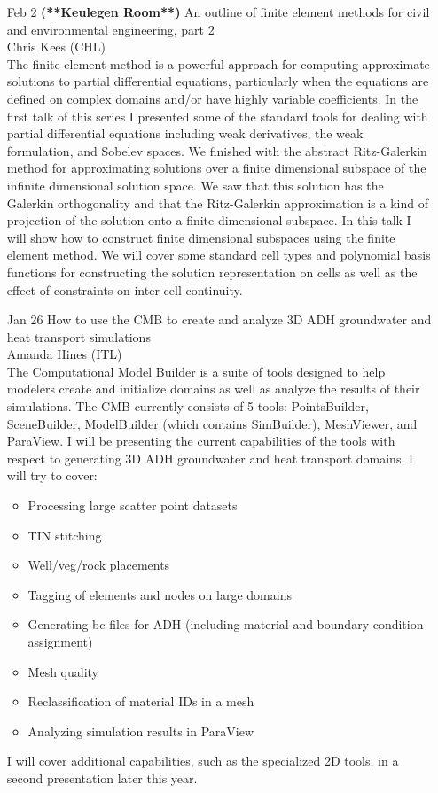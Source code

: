 \documentclass[12]{article}
\begin{document}
\begin{enumerate}
\item[Feb 2 {\bf (**Keulegen Room**)}]An outline of finite element methods for civil and environmental engineering, part 2\\Chris Kees (CHL)\\
The finite element method is a powerful approach for computing approximate solutions to partial differential equations, particularly when the equations are defined on complex domains and/or have highly variable coefficients. In the first talk of this series I presented some of the standard tools for dealing with partial differential equations including weak derivatives, the weak formulation, and Sobelev spaces. We finished with the abstract Ritz-Galerkin method for approximating solutions over a finite dimensional subspace of the infinite dimensional solution space. We saw that this solution has the Galerkin orthogonality and that the Ritz-Galerkin approximation is a kind of projection of the solution onto a finite dimensional subspace. In this talk I will show how to construct finite dimensional subspaces using the finite element method. We will cover some standard cell types and polynomial basis functions for constructing the solution representation on cells as well as the effect of constraints on inter-cell continuity.

\item[Jan 26] How to use the CMB to create and analyze 3D ADH
  groundwater and heat transport simulations\\Amanda Hines (ITL)\\ The
  Computational Model Builder is a suite of tools designed to help
  modelers create and initialize domains as well as analyze the
  results of their simulations. The CMB currently consists of 5 tools:
  PointsBuilder, SceneBuilder, ModelBuilder (which contains
  SimBuilder), MeshViewer, and ParaView. I will be presenting the
  current capabilities of the tools with respect to generating 3D ADH
  groundwater and heat transport domains. I will try to cover:
\begin{itemize}
\item Processing large scatter point datasets
\item TIN stitching
\item Well/veg/rock placements
\item Tagging of elements and nodes on large domains
\item Generating bc files for ADH (including material and boundary condition assignment)
\item Mesh quality
\item Reclassification of material IDs in a mesh
\item Analyzing simulation results in ParaView 
\end{itemize}
I will cover additional capabilities, such as the specialized 2D
tools, in a second presentation later this year.


\end{enumerate}
\end{document}
